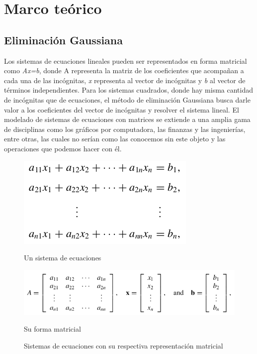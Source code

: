 \section{Marco teórico}

\subsection{Eliminación Gaussiana}
\label{sec:gaussiana}

Los sistemas de ecuaciones lineales pueden ser representados en forma matricial como \textit{Ax=b}, donde A representa la matriz de los coeficientes que acompañan a cada una de las incógnitas, \textit{x} representa al vector de incógnitas y \textit{b} al vector de términos independientes. Para los sistemas cuadrados, donde hay misma cantidad de incógnitas que de ecuaciones, el método de eliminación Gaussiana busca darle valor a los coeficientes del vector de incógnitas y resolver el sistema lineal. El modelado de sistemas de ecuaciones con matrices se extiende a una amplia gama de disciplinas como los gráficos por computadora, las finanzas y las ingenierías, entre otras, las cuales no serían como las conocemos sin este objeto y las operaciones que podemos hacer con él. 

\begin{figure}[H]
    \centering
    \begin{minipage}{0.3\linewidth}
        \includegraphics[width=\linewidth]{img/sistema_de_ecuaciones.png}
        \caption{Un sistema de ecuaciones}
    \end{minipage}
  \begin{minipage}{0.45\linewidth}
      \includegraphics[width=\linewidth]{img/combinacion_lineal.png}
      \caption{Su forma matricial}
  \end{minipage}
  \caption{Sistemas de ecuaciones con su respectiva representación matricial}
\end{figure}

